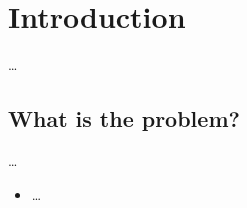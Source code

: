 \mode*
\section{Introduction}

\dots

\subsection{What is the problem?}

\dots

\begin{frame}
  \begin{itemize}
    \item \dots
  \end{itemize}
\end{frame}



\begin{frame}[allowframebreaks]
  \printbibliography{}
\end{frame}
